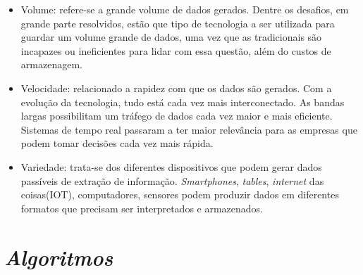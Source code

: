 \begin{itemize}
  \item Volume: refere-se a grande volume de dados gerados. Dentre os desafios, em grande parte resolvidos, estão que tipo de tecnologia a ser utilizada para guardar um volume grande de dados, uma vez que as tradicionais são incapazes ou ineficientes para lidar com essa questão, além do custos de armazenagem.
  \item Velocidade: relacionado a rapidez com que os dados são gerados. Com a evolução da tecnologia, tudo está cada vez mais interconectado. As bandas largas possibilitam um tráfego de dados cada vez maior e mais eficiente. Sistemas de tempo real passaram a ter maior relevância para as empresas que podem tomar decisões cada vez mais rápida.
  \item Variedade: trata-se dos diferentes dispositivos que podem gerar dados passíveis de extração de informação. \emph{Smartphones}, \emph{tables}, \emph{internet} das coisas(IOT), computadores, sensores podem produzir dados em diferentes formatos que precisam ser interpretados e armazenados.
\end{itemize}


\chapter{\emph{Algoritmos}}






